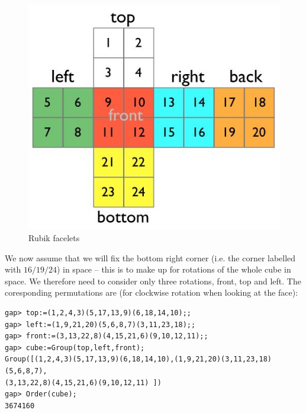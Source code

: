 \documentclass{beamer}
\theoremstyle{definition}
\theoremstyle{remark}
\begin{document}
\begin{frame}[fragile]
	\begin{figure}
		\centering
		\includegraphics[scale=0.5]{Rubik}
		\caption{Rubik facelets}
	\end{figure}
\end{frame}


\begin{frame}[fragile]
	We now assume that we will ﬁx the bottom right corner (i.e. the corner labelled with $16/19/24$) in
	space – this is to make up for rotations of the whole cube in space. We therefore need to consider
	only three rotations, front, top and left. The coresponding permutations are (for clockwise rotation
	when looking at the face):
\begin{verbatim}
gap> top:=(1,2,4,3)(5,17,13,9)(6,18,14,10);;
gap> left:=(1,9,21,20)(5,6,8,7)(3,11,23,18);;
gap> front:=(3,13,22,8)(4,15,21,6)(9,10,12,11);;
gap> cube:=Group(top,left,front);
Group([(1,2,4,3)(5,17,13,9)(6,18,14,10),(1,9,21,20)(3,11,23,18)(5,6,8,7),
(3,13,22,8)(4,15,21,6)(9,10,12,11) ])
gap> Order(cube);
3674160
\end{verbatim}
\end{frame}
\end{document}
